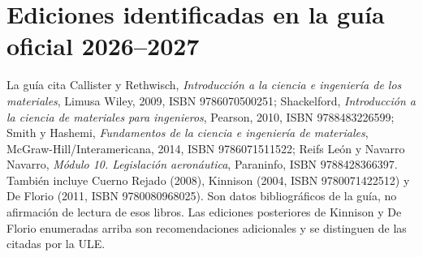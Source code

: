 \section*{Ediciones identificadas en la guía oficial 2026--2027}
La guía cita Callister y Rethwisch, \textit{Introducción a la ciencia e ingeniería de los materiales}, Limusa Wiley, 2009, ISBN 9786070500251; Shackelford, \textit{Introducción a la ciencia de materiales para ingenieros}, Pearson, 2010, ISBN 9788483226599; Smith y Hashemi, \textit{Fundamentos de la ciencia e ingeniería de materiales}, McGraw-Hill/Interamericana, 2014, ISBN 9786071511522; Reifs León y Navarro Navarro, \textit{Módulo 10. Legislación aeronáutica}, Paraninfo, ISBN 9788428366397. También incluye Cuerno Rejado (2008), Kinnison (2004, ISBN 9780071422512) y De Florio (2011, ISBN 9780080968025). Son datos bibliográficos de la guía, no afirmación de lectura de esos libros. Las ediciones posteriores de Kinnison y De Florio enumeradas arriba son recomendaciones adicionales y se distinguen de las citadas por la ULE.
